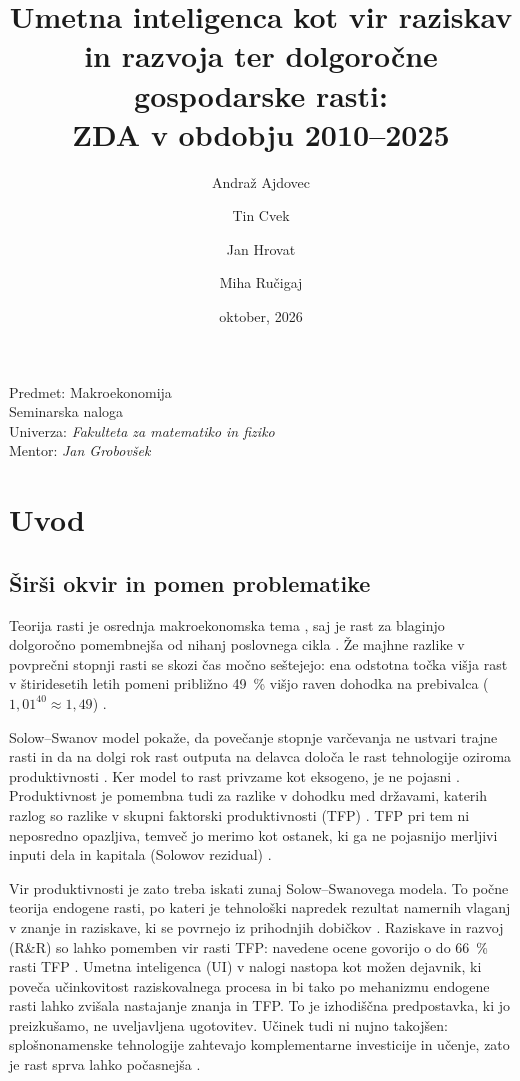 \documentclass[12pt,a4paper]{article}
\title{\textbf{Umetna inteligenca kot vir raziskav in razvoja ter dolgoročne gospodarske rasti:}\\
ZDA v obdobju 2010--2025}
\author{
Andraž Ajdovec \and Tin Cvek \and Jan Hrovat \and Miha Ručigaj
}
\date{oktober, 2026}
\begin{document}
\maketitle
\thispagestyle{empty}

\vfill
\begin{center}
Predmet: Makroekonomija\\
Seminarska naloga\\
Univerza: \textit{Fakulteta za matematiko in fiziko}\\
Mentor: \textit{Jan Grobovšek}
\end{center}
\vfill

\newpage
\tableofcontents
\newpage



\section{Uvod}\label{sec:uvod}

\subsection{Širši okvir in pomen problematike}
Teorija rasti je osrednja makroekonomska tema \parencite[str.~1]{polanec_rast}, saj je rast za blaginjo dolgoročno pomembnejša od nihanj poslovnega cikla \parencite[str.~5]{garin2021}. Že majhne razlike v povprečni stopnji rasti se skozi čas močno seštejejo: ena odstotna točka višja rast v štiridesetih letih pomeni približno 49~\% višjo raven dohodka na prebivalca ($1{,}01^{40}\approx 1{,}49$) \parencite[str.~4]{polanec_rast}.

Solow--Swanov model pokaže, da povečanje stopnje varčevanja ne ustvari trajne rasti in da na dolgi rok rast outputa na delavca določa le rast tehnologije oziroma produktivnosti \parencites[str.~13--14]{polanec_rast}[str.~108]{garin2021}. Ker model to rast privzame kot eksogeno, je ne pojasni \parencites[str.~18]{polanec_rast}[str.~129]{garin2021}. Produktivnost je pomembna tudi za razlike v dohodku med državami, katerih razlog so razlike v skupni faktorski produktivnosti (TFP) \parencite[str.~143--144]{garin2021}. TFP pri tem ni neposredno opazljiva, temveč jo merimo kot ostanek, ki ga ne pojasnijo merljivi inputi dela in kapitala (Solowov rezidual) \parencites[str.~22]{polanec_rast}[str.~142]{garin2021}.

Vir produktivnosti je zato treba iskati zunaj Solow--Swanovega modela. To počne teorija endogene rasti, po kateri je tehnološki napredek rezultat namernih vlaganj v znanje in raziskave, ki se povrnejo iz prihodnjih dobičkov \parencite[str.~18]{polanec_rast}. Raziskave in razvoj (R\&R) so lahko pomemben vir rasti TFP: navedene ocene govorijo o do 66~\% rasti TFP \parencite[str.~28]{polanec_rast}. Umetna inteligenca (UI) v nalogi nastopa kot možen dejavnik, ki poveča učinkovitost raziskovalnega procesa in bi tako po mehanizmu endogene rasti lahko zvišala nastajanje znanja in TFP. To je izhodiščna predpostavka, ki jo preizkušamo, ne uveljavljena ugotovitev. Učinek tudi ni nujno takojšen: splošnonamenske tehnologije zahtevajo komplementarne investicije in učenje, zato je rast sprva lahko počasnejša \parencite[str.~28]{polanec_rast}.
\end{document}
